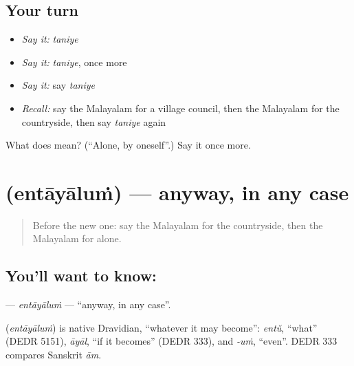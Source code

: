 \subsection*{Your turn}
\begin{itemize}
\raggedright
  \item \emph{Say it:} \emph{taniye}
  \item \emph{Say it:} \emph{taniye}, once more
  \item \emph{Say it:} say \emph{taniye}
  \item \emph{Recall:} say the Malayalam for a village council, then the Malayalam for the countryside, then say \emph{taniye} again
\end{itemize}

\begin{tcolorbox}[breakable,colback=teal!4,colframe=teal!35!black,title={Before you move on}]
What does  mean? (\textquotedblleft{}Alone, by oneself\textquotedblright{}.) Say it once more.
\end{tcolorbox}
\section[\texorpdfstring{\ml{എന്തായാലും} (entāyāluṁ)}{എന്തായാലും (entāyāluṁ)}]{ (entāyāluṁ) — anyway, in any case}

\label{lesson:ML-C317-entayalum}



\begin{quote}
Before the new one: say the Malayalam for the countryside, then the Malayalam for alone.
\end{quote}

\subsection*{You'll want to know: }
\textbf{} — \emph{entāyāluṁ} — \textquotedblleft{}anyway, in any case\textquotedblright{}.

\begin{cousinweb}
\textbf{} (\emph{entāyāluṁ}) is native Dravidian, \textquotedblleft{}whatever it may become\textquotedblright{}: \emph{entŭ}, \textquotedblleft{}what\textquotedblright{} (DEDR 5151), \emph{āyāl}, \textquotedblleft{}if it becomes\textquotedblright{} (DEDR 333), and \emph{-uṁ}, \textquotedblleft{}even\textquotedblright{}. DEDR 333 compares Sanskrit \emph{ām}.
\end{cousinweb}

